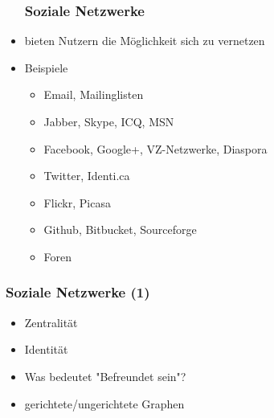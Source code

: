 \documentclass{beamer}
\begin{document}
\begin{frame}
  \begin{itemize}
  \frametitle{Soziale Netzwerke}
    \item bieten Nutzern die Möglichkeit sich zu vernetzen
    \item Beispiele
      \begin{itemize}
        \item Email, Mailinglisten
        \item Jabber, Skype, ICQ, MSN
        \item Facebook, Google+, VZ-Netzwerke, Diaspora
        \item Twitter, Identi.ca
        \item Flickr, Picasa
        \item Github, Bitbucket, Sourceforge
        \item Foren
      \end{itemize}
  \end{itemize}
\end{frame}

\begin{frame}
  \frametitle{Soziale Netzwerke (1)}
  \begin{itemize}
    \item<2-> Zentralität
    \item<3-> Identität
    \item<4-> Was bedeutet "Befreundet sein"?
    \item<5-> gerichtete/ungerichtete Graphen
  \end{itemize}
\end{frame}
\end{document}
